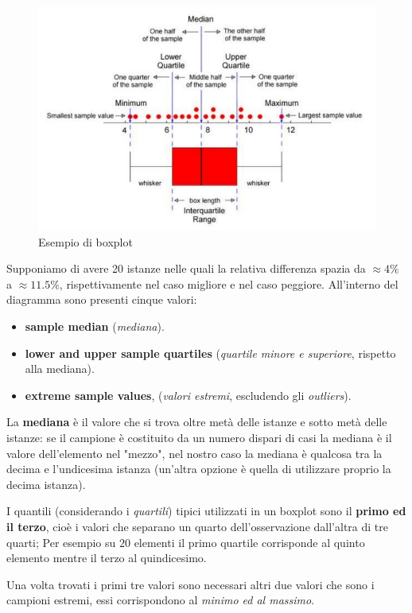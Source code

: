 \documentclass{article}
\begin{document}
\begin{figure}[H]
    \centering
    \includegraphics[scale=0.5]{images/boxplot.png}
    \caption{Esempio di boxplot}
\end{figure}
Supponiamo di avere 20 istanze nelle quali la relativa differenza spazia da $\approx4\%$ a $\approx11.5\%$,
rispettivamente nel caso migliore e nel caso peggiore.
All'interno del diagramma sono presenti cinque valori:
\begin{itemize}
    \item \textbf{sample median} (\textit{mediana}).
    \item \textbf{lower and upper sample quartiles} (\textit{quartile minore e superiore}, rispetto alla mediana).
    \item \textbf{extreme sample values}, (\textit{valori estremi}, escludendo gli \textit{outliers}).
\end{itemize}

La \textbf{mediana} è il valore che si trova oltre
metà delle istanze e sotto metà delle istanze: se il campione è costituito da un numero dispari di casi
la mediana è il valore dell'elemento nel "mezzo", nel nostro caso la mediana è qualcosa tra la decima
e l'undicesima istanza (un'altra opzione è quella di utilizzare proprio la decima istanza).

I quantili (considerando i \textit{quartili}) tipici utilizzati in un boxplot sono il
\textbf{primo ed il terzo}, cioè i valori che separano un quarto dell'osservazione dall'altra
di tre quarti; Per esempio su $20$ elementi il primo quartile corrisponde al quinto elemento
mentre il terzo al quindicesimo.

Una volta trovati i primi tre valori sono necessari altri due valori che sono i campioni estremi,
essi corrispondono al \textit{minimo ed al massimo}.
\end{document}
